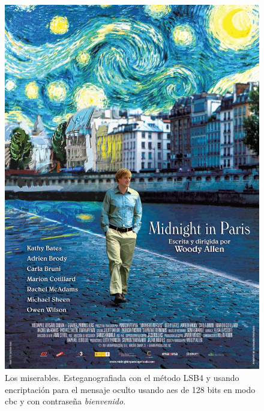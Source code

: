 \documentclass[a4paper,10pt]{article}
\begin{document}
\begin{figure}[!htb]
%
  \includegraphics[scale=0.175]{./images/medianocheparis1.png}
  \caption{Los miserables. Esteganografiada con el método LSB4 y usando encriptación para el mensaje oculto usando aes de 128 bits en
    modo cbc y con contraseña \textit{bienvenido}.}\label{fig:awesome_image3}
\endminipage
{}%


\end{figure}
\end{document}
